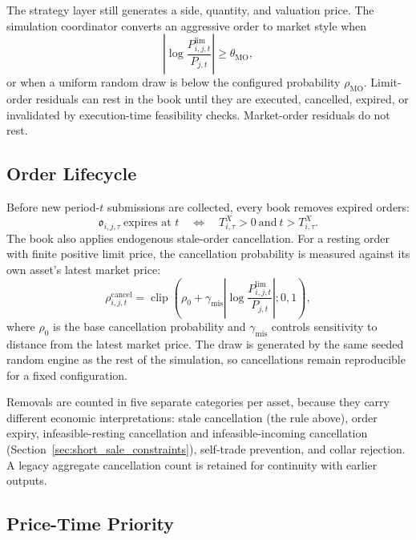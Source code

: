 \documentclass[12pt, a4paper]{article}
\DeclareMathOperator{\clip}{clip}
\begin{document}
    The strategy layer still generates a side, quantity, and valuation price. The
    simulation coordinator converts an aggressive order to market style when
    \[
        \left|\log\frac{P_{i,j,t}^{\text{lim}}}{P_{j,t}}\right|
        \ge \theta_{\mathrm{MO}},
    \]
    or when a uniform random draw is below the configured probability
    \(\rho_{\mathrm{MO}}\). Limit-order residuals can rest in the book until they
    are executed, cancelled, expired, or invalidated by execution-time feasibility
    checks. Market-order residuals do not rest.

    \subsection{Order Lifecycle}

    Before new period-\(t\) submissions are collected, every book removes expired
    orders:
    \[
        \mathfrak{o}_{i,j,\tau}\ \text{expires at }t
        \quad\Longleftrightarrow\quad
        T_{i,\tau}^{X}>0\ \text{and}\ t>T_{i,\tau}^{X}.
    \]
    The book also applies endogenous stale-order cancellation. For a resting order
    with finite positive limit price, the cancellation probability is measured
    against its own asset's latest market price:
    \[
        \rho_{i,j,t}^{\mathrm{cancel}}
        =
        \clip\!\left(
                   \rho_0+\gamma_{\mathrm{mis}}
                   \left|\log\frac{P_{i,j,t}^{\text{lim}}}{P_{j,t}}\right|;
            0,1
        \right),
    \]
    where \(\rho_0\) is the base cancellation probability and
    \(\gamma_{\mathrm{mis}}\) controls sensitivity to distance from the latest
    market price. The draw is generated by the same seeded random engine as the
    rest of the simulation, so cancellations remain reproducible for a fixed
    configuration.

    Removals are counted in five separate categories per asset, because they carry
    different economic interpretations: stale cancellation (the rule above), order
    expiry, infeasible-resting cancellation and infeasible-incoming cancellation
    (Section~\ref{sec:short_sale_constraints}), self-trade prevention, and
    collar rejection. A legacy aggregate cancellation count is retained for
    continuity with earlier outputs.

    \subsection{Price-Time Priority}
\end{document}
